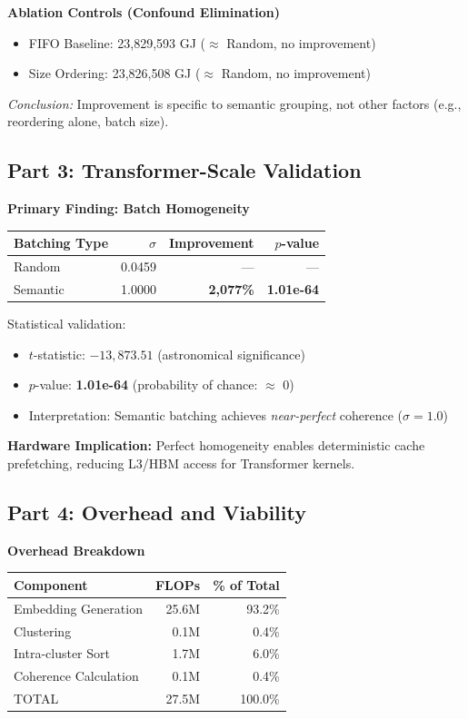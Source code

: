 \documentclass[11pt,twocolumn]{article}
\begin{document}
\textbf{Ablation Controls (Confound Elimination)}

\begin{itemize}
\item FIFO Baseline: 23,829,593 GJ ($\approx$ Random, no improvement)
\item Size Ordering: 23,826,508 GJ ($\approx$ Random, no improvement)
\end{itemize}

\noindent
\textit{Conclusion:} Improvement is specific to semantic grouping, not other factors (e.g., reordering alone, batch size).

\subsection{Part 3: Transformer-Scale Validation}

\textbf{Primary Finding: Batch Homogeneity}

\begin{table}[h]
\centering
\small
\begin{tabular}{lrrr}
\toprule
Batching Type & $\sigma$ & Improvement & $p$-value \\
\midrule
Random & 0.0459 & --- & --- \\
Semantic & 1.0000 & \textbf{2,077\%} & \textbf{1.01e-64} \\
\bottomrule
\end{tabular}
\end{table}

Statistical validation:
\begin{itemize}
\item $t$-statistic: $-13,873.51$ (astronomical significance)
\item $p$-value: \textbf{1.01e-64} (probability of chance: $\approx$ 0)
\item Interpretation: Semantic batching achieves \textit{near-perfect} coherence ($\sigma = 1.0$)
\end{itemize}

\textbf{Hardware Implication:} Perfect homogeneity enables deterministic cache prefetching, reducing L3/HBM access for Transformer kernels.

\subsection{Part 4: Overhead and Viability}

\textbf{Overhead Breakdown}

\begin{table}[h]
\centering
\small
\begin{tabular}{lrr}
\toprule
Component & FLOPs & \% of Total \\
\midrule
Embedding Generation & 25.6M & 93.2\% \\
Clustering & 0.1M & 0.4\% \\
Intra-cluster Sort & 1.7M & 6.0\% \\
Coherence Calculation & 0.1M & 0.4\% \\
\midrule
TOTAL & 27.5M & 100.0\% \\
\bottomrule
\end{tabular}
\end{table}
\end{document}
